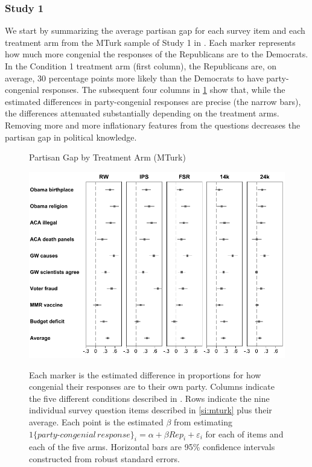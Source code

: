 \documentclass[12pt, letterpaper]{article}
\begin{document}
\subsubsection*{Study 1}
We start by summarizing the average partisan gap for each survey item and each treatment arm from the MTurk sample of Study 1 in . Each marker represents how much more congenial the responses of the Republicans are to the Democrats. In the Condition 1 treatment arm (first column), the Republicans are, on average, 30 percentage points more likely than the Democrats to have party-congenial responses. The subsequent four columns in \cref{fig:partisangaps-mturk} show that, while the estimated differences in party-congenial responses are precise (the narrow bars), the differences attenuated substantially depending on the treatment arms. Removing more and more inflationary features from the questions decreases the partisan gap in political knowledge.

%

\begin{center}
	\begin{figure}[t]
		\centering
		\caption{Partisan Gap by Treatment Arm (MTurk)}
		\includegraphics[width=\textwidth]{../figs/partisan-gap-by-item-arm.pdf}
		\label{fig:partisangaps-mturk}
		\caption*{\footnotesize 
			Each marker is the estimated difference in proportions for how congenial their responses are to their own party.
			Columns indicate the five different conditions described in . Rows indicate the nine individual survey question items described in \cref{si:mturk} plus their average.
			Each point is the estimated $\beta$ from estimating $1\{party\text{-}congenial\, response\}_i = \alpha + \beta Rep_i + \varepsilon_i$ for each of items and each of the five arms.			
			Horizontal bars are 95\% confidence intervals constructed from robust standard errors.
		}
	\end{figure}
\end{center}
\end{document}
